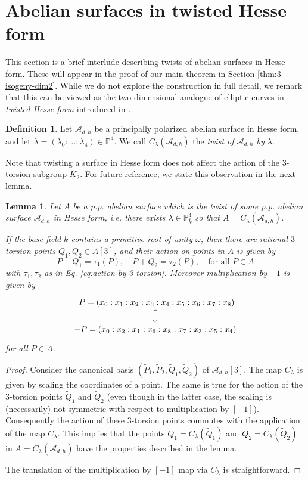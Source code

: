 \documentclass[11pt]{amsart}
\newtheorem{lemma}[theorem]{Lemma}
\theoremstyle{definition}
\newtheorem{definition}[theorem]{Definition}
\newcommand{\A}{\mathcal{A}}
\newcommand{\PP}{\mathbb{P}}
\begin{document}
\section{Abelian surfaces in twisted Hesse form} \label{sec:twisted-surface}

This section is a brief interlude describing twists of abelian surfaces in Hesse form. These will appear in the proof of our main theorem in Section \ref{thm:3-isogeny-dim2}. While we do not explore the construction in full detail, we remark that this can be viewed as the two-dimensional analogue of elliptic curves in {\em twisted Hesse form} introduced in \cite{bernstein2015twisted}.

\begin{definition} \label{def:twisted-surface}
    Let $\A_{d,h}$ be a principally polarized abelian surface in Hesse form, and let $\lambda = (\lambda_0: \dots : \lambda_4) \in \PP^4$. We call $C_\lambda(\A_{d,h})$ the {\em twist of $\A_{d,h}$ by $\lambda$}. 
\end{definition}

Note that twisting a surface in Hesse form does not affect the action of the $3$-torsion subgroup $K_2$. For future reference, we state this observation in the next lemma. 

\begin{lemma} \label{lem:twisted-3-torsion-action}
   Let $A$ be a p.p. abelian surface which is the twist of some p.p. abelian surface $\A_{d,h}$ in Hesse form, i.e. there exists $\lambda \in \PP^4_{\bar{k}}$ so that $A = C_\lambda(\A_{d,h})$. 

   If the base field $k$ contains a primitive root of unity $\omega$, then there are rational $3$-torsion points $Q_1, Q_2 \in A[3]$, and their action on points in $A$ is given by
   \[
    P + Q_1 = \tau_1(P), \quad P + Q_2 = \tau_2(P), \quad \text{for all } P \in A
   \]
   with $\tau_1,\tau_2$ as in Eq. \ref{eq:action-by-3-torsion}.
   Moreover multiplication by $-1$ is given by 
    \[
    \begin{tikzcd} [row sep = 15pt] 
    ~P = (x_0:x_1:x_2:x_3:x_4:x_5:x_6:x_7:x_8) \dar[maps to]\\
    -P = (x_0:x_2:x_1:x_6:x_8:x_7:x_3:x_5:x_4)
    \end{tikzcd}
    \]
    for all $P \in A$.
\end{lemma}

\begin{proof}
    Consider the canonical basis $(\tilde{P}_1, \tilde{P}_2, \tilde{Q}_1, \tilde{Q}_2)$ of $\A_{d,h}[3]$. The map $C_\lambda$ is given by scaling the coordinates of a point. The same is true for the action of the $3$-torsion points $\tilde{Q}_1$ and $\tilde{Q}_2$ (even though in the latter case, the scaling is (necessarily) not symmetric with respect to multiplication by $[-1]$). Consequently the action of these $3$-torsion points  commutes with the application of the map $C_\lambda$. This implies that the points $Q_1 = C_{\lambda}(\tilde{Q}_1)$ and $Q_2 = C_{\lambda}(\tilde{Q}_2)$ in $A = C_\lambda(\A_{d,h})$ have the properties described in the lemma. 

    The translation of the multiplication by $[-1]$ map  via $C_\lambda$ is straightforward.
\end{proof}
\end{document}
